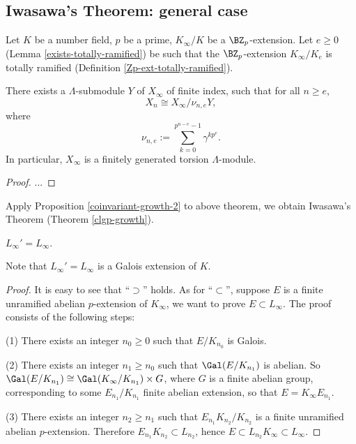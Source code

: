 \subsection{Iwasawa's Theorem: general case}

Let $K$ be a number field, $p$ be a prime,
$K_\infty/K$ be a $\BZ_p$-extension.
Let $e\geq 0$ (Lemma \ref{exists-totally-ramified})
be such that the $\BZ_p$-extension $K_\infty/K_e$
is totally ramified (Definition \ref{Zp-ext-totally-ramified}).

\begin{thm}
\label{Xn-isom-qout}
There exists a $\Lambda$-submodule $Y$ of $X_\infty$ of finite index,
such that for all $n\geq e$,
$$
X_n\cong X_\infty/\nu_{n,e}Y,
$$
where
$$
\nu_{n,e}:=\sum_{k=0}^{p^{n-e}-1}\gamma^{kp^e}.
$$
In particular, $X_\infty$ is a finitely generated torsion $\Lambda$-module.
\end{thm}

\begin{proof}
...
\end{proof}

Apply Proposition \ref{coinvariant-growth-2} to above theorem,
we obtain Iwasawa's Theorem (Theorem \ref{clgp-growth}).

\iffalse
\begin{prop}
\label{Zp-ext-L-eq-L}
$L_\infty'=L_\infty$.
\end{prop}

Note that $L_\infty'=L_\infty$ is a Galois extension of $K$.

\begin{proof}
It is easy to see that ``$\supset$'' holds.
As for ``$\subset$'', suppose $E$ is a finite
unramified abelian $p$-extension of $K_\infty$,
we want to prove $E\subset L_\infty$. The proof consists of the following steps:

(1) There exists an integer $n_0\geq 0$ such that $E/K_{n_0}$ is Galois.

(2) There exists an integer $n_1\geq n_0$ such that $\Gal(E/K_{n_1})$ is abelian.
So $\Gal(E/K_{n_1})\cong\Gal(K_\infty/K_{n_1})\times G$,
where $G$ is a finite abelian group, corresponding to some $E_{n_1}/K_{n_1}$
finite abelian extension, so that $E=K_\infty E_{n_1}$.

(3) There exists an integer $n_2\geq n_1$ such that $E_{n_1}K_{n_2}/K_{n_2}$
is a finite unramified abelian $p$-extension. Therefore $E_{n_1}K_{n_2}\subset L_{n_2}$,
hence $E\subset L_{n_2}K_\infty\subset L_\infty$.
\end{proof}

